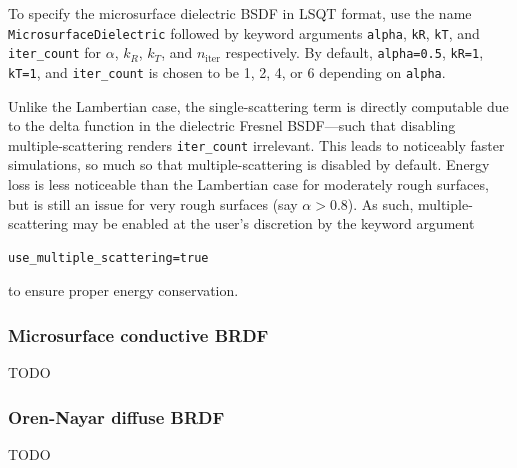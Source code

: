 \documentclass[
    twoside,
    twocolumn,
    letterpaper,
    10pt]{article}
\newcommand\namett[2]{{\color{code#1}\texttt{#2}}}
\begin{document}
To specify the microsurface dielectric BSDF 
in LSQT format, use the name
\namett{purple}{MicrosurfaceDielectric}
followed by keyword arguments \texttt{alpha}, \texttt{kR},
\texttt{kT}, and \texttt{iter\_count} for $\alpha$, $k_R$, $k_T$, and 
$n_{\text{iter}}$ respectively. By default, \texttt{alpha=0.5},
\texttt{kR=1}, \texttt{kT=1}, and \texttt{iter\_count} is chosen to 
be 1, 2, 4, or 6 depending on \texttt{alpha}. 


Unlike the Lambertian case, the single-scattering term is directly 
computable due to the delta function 
in the dielectric Fresnel BSDF---such that disabling multiple-scattering 
renders \texttt{iter\_count} irrelevant. This leads to noticeably faster
simulations, so much so that multiple-scattering is disabled by 
default. Energy loss is less noticeable than the Lambertian case
for moderately rough surfaces,
but is still an issue for very rough surfaces 
(say $\alpha > 0.8$). As such, multiple-scattering may be 
enabled at the user's discretion by the keyword argument
\begin{lstlisting}
use_multiple_scattering=true
\end{lstlisting}
to ensure proper energy conservation.


\subsubsection{Microsurface conductive BRDF}
\label{sec:doc-layers-microsurface-conductive}

TODO

\subsubsection{Oren-Nayar diffuse BRDF}
\label{sec:doc-layers-oren-nayar-diffuse}

TODO

{
\nocite{*}
\raggedright
\printbibliography
}
\end{document}
